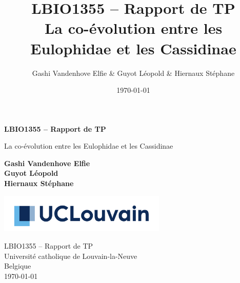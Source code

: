 \documentclass[a4paper, 11pt]{article}
\title{\Large LBIO1355 – Rapport de TP \\
\huge La co-évolution entre les Eulophidae et les Cassidinae}
\author{Gashi Vandenhove Elfie & Guyot Léopold & Hiernaux Stéphane}
\date{\today}
\begin{document}
\begin{titlepage}
   \begin{center}
       \vspace*{1cm}

        \LARGE
       \textbf{ LBIO1355 – Rapport de TP}

       \vspace{0.5cm}
       \Large
       La co-évolution entre les Eulophidae et les Cassidinae
            
       \vspace{1.5cm}
        \Large
       \textbf{Gashi Vandenhove Elfie\\ Guyot Léopold\\ Hiernaux Stéphane}

       \vfill
       \vspace{0.8cm}
     
       \includegraphics[width=0.6\textwidth]{UCLouvain_Logo_Pos_CMJN.pdf}
            
      \large LBIO1355 – Rapport de TP\\
       Université catholique de Louvain-la-Neuve\\
       Belgique\\
       \today
            
   \end{center}
\end{titlepage}


\pagestyle{fancy}
\fancyhead{}\fancyfoot{}
\end{document}
